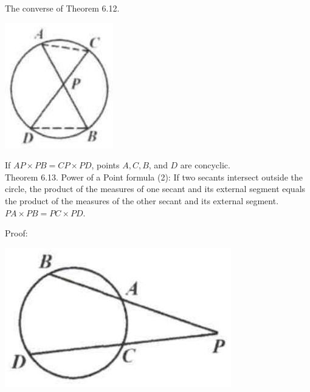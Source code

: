 \documentclass{article}
\begin{document}
The converse of Theorem 6.12.
\begin{center}
\includegraphics[width=\textwidth]{images/192(1).jpg}
\end{center}

If \(A P \times P B=C P \times P D\), points \(A, C, B\), and \(D\) are concyclic.\\
Theorem 6.13. Power of a Point formula (2): If two secants intersect outside the circle, the product of the measures of one secant and its external segment equals the product of the measures of the other secant and its external segment.\\
\(P A \times P B=P C \times P D\).

Proof:
\begin{center}
\includegraphics[width=\textwidth]{images/192(3).jpg}
\end{center}
\end{document}
